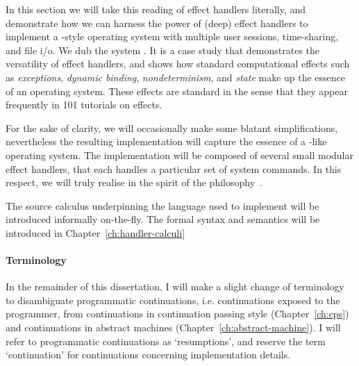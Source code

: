 \documentclass[12pt,phd,lfcs,twoside,openright,logo,leftchapter,normalheadings]{infthesis}
\theoremstyle{plain}
\theoremstyle{definition}
\begin{document}
In this section we will take this reading of effect handlers
literally, and demonstrate how we can harness the power of (deep)
effect handlers to implement a \UNIX{}-style operating system with
multiple user sessions, time-sharing, and file i/o. We dub the system
\OSname{}.
%
It is a case study that demonstrates the versatility of effect
handlers, and shows how standard computational effects such as
\emph{exceptions}, \emph{dynamic binding}, \emph{nondeterminism}, and
\emph{state} make up the essence of an operating system. These effects
are standard in the sense that they appear frequently in 101 tutorials
on effects.

For the sake of clarity, we will occasionally make some blatant
simplifications, nevertheless the resulting implementation will
capture the essence of a \UNIX{}-like operating system.
%
The implementation will be composed of several small modular effect
handlers, that each handles a particular set of system commands. In
this respect, we will truly realise \OSname{} in the spirit of the
\UNIX{} philosophy~\cite[Section~1.6]{Raymond03}.

The source calculus underpinning the language used to implement
\OSname{} will be introduced informally on-the-fly. The formal syntax
and semantics will be introduced in Chapter~\ref{ch:handler-calculi}

\paragraph{Terminology}
In the remainder of this dissertation, I will make a slight change of
terminology to disambiguate programmatic continuations,
i.e. continuations exposed to the programmer, from continuations in
continuation passing style (Chapter~\ref{ch:cps}) and continuations in
abstract machines (Chapter~\ref{ch:abstract-machine}). I will refer to
programmatic continuations as `resumptions', and reserve the term
`continuation' for continuations concerning implementation details.
\end{document}
